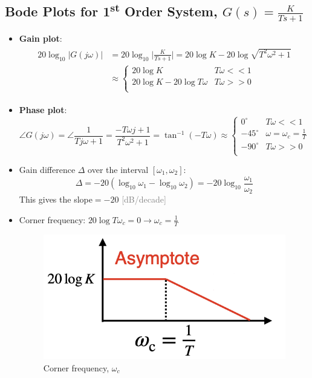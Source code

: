 \subsection{Bode Plots for 1\textsuperscript{st} Order System, $G(s) = \frac{K}{Ts+1}$}
\begin{itemize}
\item \textbf{Gain plot}: 
\begin{align*}
\begin{split}
 20\log_{10}\lvert G(j\omega) \rvert  &= 20\log_{10} \lvert \frac{K}{Ts+1} \rvert = 20\log K-20\log\sqrt{T^{2}\omega^{2}+1} \\
 &\approx 
\begin{cases} 
20 \log K & T\omega<<1\\
20 \log K - 20\log T\omega &  T\omega>>0\\
\end{cases} \end{split} \end{align*}
\item  \textbf{Phase plot}: 
\[\angle G(j\omega) = \angle \frac{1}{Tj\omega+1}=\frac{-T\omega j +1}{T^{2}\omega^{2}+1}=\tan^{-1}(-T\omega)\approx \begin{cases}
0^{\circ} & T\omega<<1\\
-45^{\circ}& \omega=\omega_{c}=\frac{1}{T}\\
-90^{\circ}& T\omega>>0\\
\end{cases}\]
\item Gain difference $\Delta$ over the interval $[\omega_{1}, \omega_{2}] $: \[ \Delta = -20(\log_{10}\omega_{1}-\log_{10}\omega_{2})=\boxed{-20 \log_{10}\frac{\omega_{1}}{\omega_{2}}}\]
This gives the slope$=- 20$ \textcolor{gray}{[dB/decade]}
\item Corner frequency: $20\log T\omega_{c}=0 \to \omega_{c} = \frac{1}{T}$

\begin{figure}[H] \centering 
\includegraphics[width=.3\textwidth]{images/corner_1.png}
\caption{Corner frequency, $\omega_{c}$}
\end{figure}


\end{itemize}

